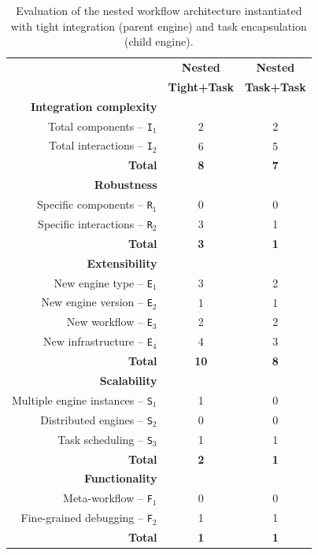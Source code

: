 \documentclass[preprint,3p,twocolumn]{elsarticle}
\newcommand{\correction}[1]{\color{blue}#1\color{black}\xspace}
\begin{document}
\begin{table}
\footnotesize
\centering
\begin{tabular}{rcc}
                                     & \textbf{Nested} & \textbf{Nested}\\
                                     & \textbf{Tight+Task} & \textbf{Task+Task}\\
\cellcolor[HTML]{EEEEEE}\textbf{Integration complexity}&\cellcolor[HTML]{EEEEEE}&\cellcolor[HTML]{EEEEEE}\\
  Total components -- \texttt{I$_1$} & 2 & 2 \\
Total interactions -- \texttt{I$_2$} & 6 & 5 \\
\textbf{Total}& \textbf{8} & \textbf{7}\\
\cellcolor[HTML]{EEEEEE}\textbf{Robustness}&\cellcolor[HTML]{EEEEEE}&\cellcolor[HTML]{EEEEEE}\\
Specific components -- \texttt{R$_1$} & 0 & 0\\
  Specific interactions -- \texttt{R$_2$} & 3 & 1\\
  \textbf{Total}& \textbf{3} & \textbf{1}\\
\cellcolor[HTML]{EEEEEE}\textbf{Extensibility}&\cellcolor[HTML]{EEEEEE}&\cellcolor[HTML]{EEEEEE}\\
  New engine type -- \texttt{E$_1$}  & 3 & 2\\
New engine version -- \texttt{E$_2$} & 1 & 1\\
  New workflow -- \texttt{E$_3$}     & 2 & 2\\
New infrastructure -- \texttt{E$_4$} & 4 & 3\\
  \textbf{Total}& \textbf{10} & \textbf{8}\\
\cellcolor[HTML]{EEEEEE}\textbf{Scalability}& \cellcolor[HTML]{EEEEEE}&\cellcolor[HTML]{EEEEEE}\\
Multiple engine instances -- \texttt{S$_1$}& 1 & 0\\
Distributed engines -- \texttt{S$_2$}& 0 & 0\\
Task scheduling -- \texttt{S$_3$}    & 1 & 1\\
\textbf{Total}& \textbf{2} & \textbf{1}\\
\cellcolor[HTML]{EEEEEE}\textbf{\correction{Functionality}}&\cellcolor[HTML]{EEEEEE}&\cellcolor[HTML]{EEEEEE}\\
  Meta-workflow  -- \texttt{\correction{F}$_1$}    & 0 & 0\\
  Fine-grained debugging -- \texttt{\correction{F}$_2$}  & 1 & 1\\
  \textbf{Total}& \textbf{1} & \textbf{1}\\
\end{tabular}
\caption{\correction{Evaluation of the nested workflow architecture instantiated with tight integration (parent engine) and task encapsulation (child engine).}}
\label{table:evaluation-2}
\end{table}
\end{document}
